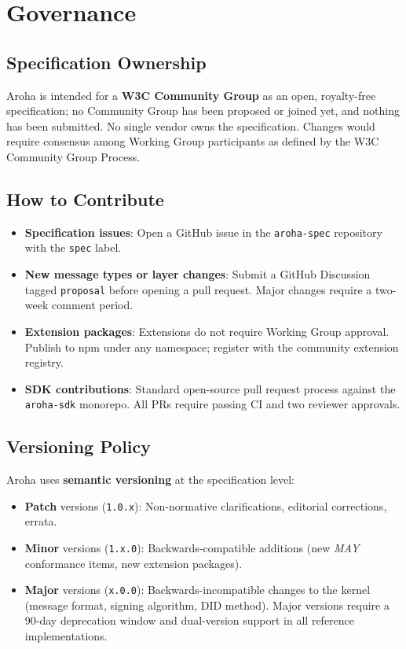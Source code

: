 \documentclass[11pt,a4paper]{article}
\begin{document}
\section{Governance}

\subsection{Specification Ownership}

Aroha is intended for a \textbf{W3C Community Group} as an open, royalty-free
specification; no Community Group has been proposed or joined yet, and nothing has been submitted. No single vendor owns the specification. Changes would require consensus
among Working Group participants as defined by the W3C Community Group Process.

\subsection{How to Contribute}

\begin{itemize}[noitemsep]
  \item \textbf{Specification issues}: Open a GitHub issue in the
        \texttt{aroha-spec} repository with the \texttt{spec} label.
  \item \textbf{New message types or layer changes}: Submit a GitHub Discussion
        tagged \texttt{proposal} before opening a pull request. Major changes require
        a two-week comment period.
  \item \textbf{Extension packages}: Extensions do not require Working Group
        approval. Publish to npm under any namespace; register with the community
        extension registry.
  \item \textbf{SDK contributions}: Standard open-source pull request process
        against the \texttt{aroha-sdk} monorepo. All PRs require passing CI and two
        reviewer approvals.
\end{itemize}

\subsection{Versioning Policy}

Aroha uses \textbf{semantic versioning} at the specification level:
\begin{itemize}[noitemsep]
  \item \textbf{Patch} versions (\texttt{1.0.x}): Non-normative clarifications,
        editorial corrections, errata.
  \item \textbf{Minor} versions (\texttt{1.x.0}): Backwards-compatible additions
        (new \textit{MAY} conformance items, new extension packages).
  \item \textbf{Major} versions (\texttt{x.0.0}): Backwards-incompatible changes
        to the kernel (message format, signing algorithm, DID method). Major versions
        require a 90-day deprecation window and dual-version support in all reference
        implementations.
\end{itemize}
\end{document}
